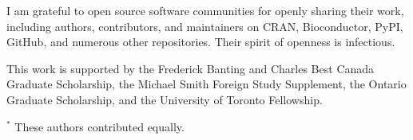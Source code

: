 \documentclass[12pt]{ut-thesis}
\begin{document}
\begin{preliminary}
\begin{acknowledgements}
I am grateful to open source software communities for openly sharing their work, including authors, contributors, and maintainers on CRAN, Bioconductor, PyPI, GitHub, and numerous other repositories. Their spirit of openness is infectious.

This work is supported by the Frederick Banting and Charles Best Canada Graduate Scholarship, the Michael Smith Foreign Study Supplement, the Ontario Graduate Scholarship, and the University of Toronto Fellowship.
\end{acknowledgements}

{
\singlespacing
\small
\setlength{\parskip}{0.1em}

\tableofcontents

\listoftables

\listoffigures

\glsaddall
\printglossary[type=\acronymtype,title=Abbreviations,nonumberlist]
}

\end{preliminary}












{
\singlespacing
\small
\setlength{\parskip}{0.1em}


\bigskip
$^*$ These authors contributed equally.

\clearpage

\clearpage


}
\end{document}
